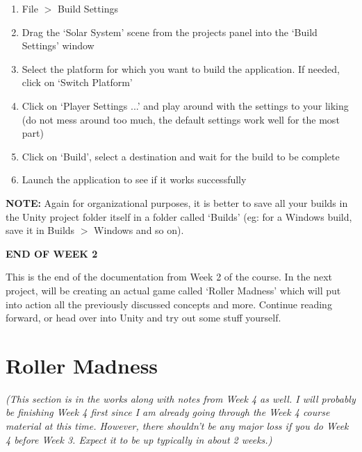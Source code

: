 \documentclass{article}[a4paper,12pt]
\theoremstyle{definition}
\begin{document}
\begin{enumerate}
	\item File $>$ Build Settings
	\item Drag the `Solar System' scene from the projects panel into the `Build Settings' window
	\item Select the platform for which you want to build the application. If needed, click on `Switch Platform'
	\item Click on `Player Settings ...' and play around with the settings to your liking (do not mess around too much, the default settings work well for the most part)
	\item Click on `Build', select a destination and wait for the build to be complete
	\item Launch the application to see if it works successfully
\end{enumerate}
\textbf{NOTE:} Again for organizational purposes, it is better to save all your builds in the Unity project folder itself in a folder called `Builds' (eg: for a Windows build, save it in Builds $>$ Windows and so on).

\hrulefill
\begin{center}\textbf{END OF WEEK 2}\end{center}
This is the end of the documentation from Week 2 of the course. In the next project, will be creating an actual game called `Roller Madness' which will put into action all the previously discussed concepts and more. Continue reading forward, or head over into Unity and try out some stuff yourself.

\hrulefill
\pagebreak
\section{Roller Madness}
\textit{(This section is in the works along with notes from Week 4 as well. I will probably be finishing Week 4 first since I am already going through the Week 4 course material at this time. However, there shouldn't be any major loss if you do Week 4 before Week 3. Expect it to be up typically in about 2 weeks.)}

\hrulefill
\end{document}
